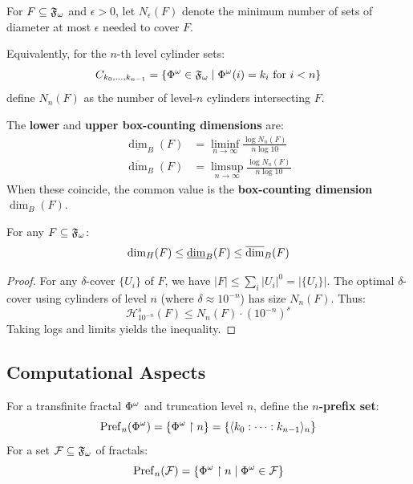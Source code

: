 \begin{definition}
\label{def:box-counting-numbers}
For $F \subseteq \mathfrak{F}_\omega$ and $\epsilon > 0$, let $N_\epsilon(F)$ denote the minimum number of sets of diameter at most $\epsilon$ needed to cover $F$.

Equivalently, for the $n$-th level cylinder sets:
\[
C_{k_0, \ldots, k_{n-1}} = \{\Phi^{\omega} \in \mathfrak{F}_\omega \mid \Phi^{\omega}(i) = k_i \text{ for } i < n\}
\]
define $N_n(F)$ as the number of level-$n$ cylinders intersecting $F$.
\end{definition}

\begin{definition}
\label{def:box-counting-dim}
The \textbf{lower} and \textbf{upper box-counting dimensions} are:
\begin{align*}
\underline{\dim}_B(F) &= \liminf_{n \to \infty} \frac{\log N_n(F)}{n \log 10} \\
\overline{\dim}_B(F) &= \limsup_{n \to \infty} \frac{\log N_n(F)}{n \log 10}
\end{align*}
When these coincide, the common value is the \textbf{box-counting dimension} $\dim_B(F)$.
\end{definition}

\begin{theorem}
\label{thm:dim-inequality}
For any $F \subseteq \mathfrak{F}_\omega$:
\[
\dim_H(F) \leq \underline{\dim}_B(F) \leq \overline{\dim}_B(F)
\]
\end{theorem}

\begin{proof}
For any $\delta$-cover $\{U_i\}$ of $F$, we have $|F| \leq \sum_i |U_i|^0 = |\{U_i\}|$. The optimal $\delta$-cover using cylinders of level $n$ (where $\delta \approx 10^{-n}$) has size $N_n(F)$. Thus:
\[
\mathcal{H}^s_{10^{-n}}(F) \leq N_n(F) \cdot (10^{-n})^s
\]
Taking logs and limits yields the inequality.
\end{proof}

\subsection{Computational Aspects}

\begin{definition}
\label{def:finite-approx}
For a transfinite fractal $\Phi^{\omega}$ and truncation level $n$, define the \textbf{$n$-prefix set}:
\[
\mathrm{Pref}_n(\Phi^{\omega}) = \{\Phi^{\omega} \restriction n\} = \{\langle k_0 : \cdots : k_{n-1} \rangle_n\}
\]
For a set $\mathcal{F} \subseteq \mathfrak{F}_\omega$ of fractals:
\[
\mathrm{Pref}_n(\mathcal{F}) = \{\Phi^{\omega} \restriction n \mid \Phi^{\omega} \in \mathcal{F}\}
\]
\end{definition}

